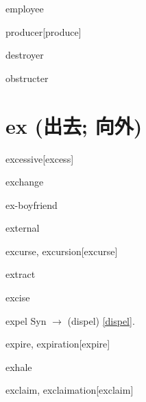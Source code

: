 \begin{RefWord}{employee}
\end{RefWord}

\begin{RefWord}{producer}[produce]
\end{RefWord}

\begin{RefWord}{destroyer}
\end{RefWord}

\begin{RefWord}{obstructer}
\end{RefWord}

\section{ex (出去; 向外)}

\begin{RefWord}{excessive}[excess]
\end{RefWord}

\begin{RefWord}{exchange}
\end{RefWord}

\begin{RefWord}{ex-boyfriend}
\end{RefWord}

\begin{RefWord}{external}
\end{RefWord}

\begin{RefWord}{excurse, excursion}[excurse]
\end{RefWord}

\begin{RefWord}{extract}
\end{RefWord}

\begin{RefWord}{excise}
\end{RefWord}

\begin{RefWord}{expel}
    Syn $\rightarrow$ (dispel) \ref{dispel}.
\end{RefWord}

\begin{RefWord}{expire, expiration}[expire]
\end{RefWord}

\begin{RefWord}{exhale}
\end{RefWord}

\begin{RefWord}{exclaim, exclaimation}[exclaim]
\end{RefWord}

